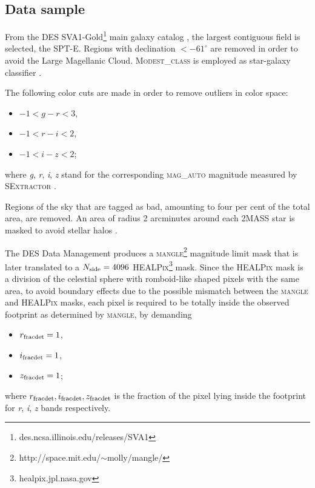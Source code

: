 \subsection{Data sample}
\label{sec:data_sample_SV}
From the DES SVA1-Gold\footnote{des.ncsa.illinois.edu/releases/SVA1} main galaxy catalog \cite{2016MNRAS.455.4301C}, the largest contiguous field is selected, the SPT-E. Regions with declination $ < -61^{\circ}$ are removed in order to avoid the Large Magellanic Cloud. {\scshape Modest\_class} is employed as star-galaxy classifier \cite{0004-637X-801-2-73}.
\newline

The following color cuts are made in order to remove outliers in color space:
\begin{itemize}
	\item $-1 < g-r < 3$,
	\item $-1 < r-i < 2$,
	\item $-1 < i-z < 2$;
\end{itemize}
where {\it g}, {\it r}, {\it i}, {\it z} stand for the corresponding {\scshape mag\_auto} magnitude measured by {\scshape SExtractor} \cite{1996A&AS..117..393B}.
\newline

Regions of the sky that are tagged as bad, amounting to four per cent of the total area, are removed. An area of radius 2 arcminutes around each 2MASS star is masked to avoid stellar halos \cite{2005MNRAS.361.1287M,0004-637X-633-2-589}.
\newline

The DES Data Management \cite{2011arXiv1109.6741S,2012ApJ...757...83D,2012SPIE.8451E..0DM} produces a {\scshape mangle}\footnote{http://space.mit.edu/$\sim$molly/mangle/} \cite{2008MNRAS.387.1391S}  magnitude limit mask that is later translated to a $N_{\rm side}=4096$ {\scshape HEALPix}\footnote{healpix.jpl.nasa.gov} \cite{2005ApJ...622..759G} mask. Since the {\scshape HEALPix} mask is a division of the celestial sphere with romboid-like shaped pixels with the same area, to avoid boundary effects due to the possible mismatch between the {\scshape mangle} and {\scshape HEALPix} masks, each pixel is required to be totally inside the observed footprint as determined by {\scshape mangle}, by demanding
\begin{itemize}
	\item $r_{\rm fracdet}=1$,
	\item $i_{\rm fracdet}=1$,
	\item $z_{\rm fracdet}=1$;
\end{itemize}
where $r_{\rm fracdet},i_{\rm fracdet},z_{\rm fracdet}$ is the fraction of the pixel lying inside the footprint for {\it r}, {\it i}, {\it z} bands respectively.
\newline

